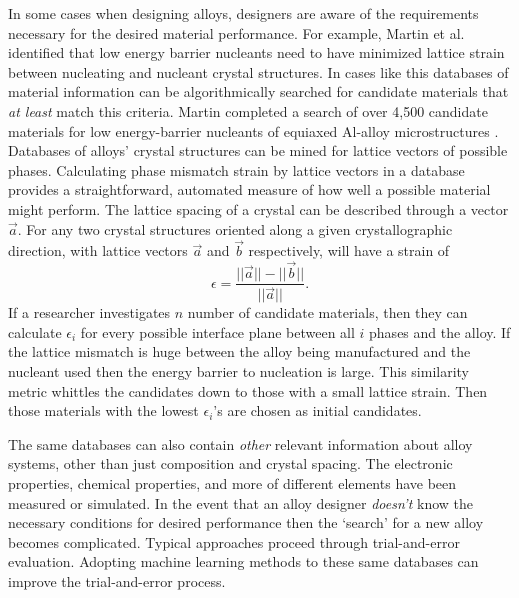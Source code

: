In some cases when designing alloys, designers are aware of the requirements necessary for the desired material performance. For example, Martin et al. identified that low energy barrier nucleants need to have minimized lattice strain between nucleating and nucleant crystal structures. In cases like this databases of material information can be algorithmically searched for candidate materials that \textit{at least} match this criteria. Martin completed a search of over 4,500 candidate materials for low energy-barrier nucleants of equiaxed Al-alloy microstructures \cite{Martin2017}. Databases of alloys' crystal structures can be mined for lattice vectors of possible phases. Calculating phase mismatch strain by lattice vectors in a database provides a straightforward, automated measure of how well a possible material might perform. The lattice spacing of a crystal can be described through a vector $\vec{a}$. For any two crystal structures oriented along a given crystallographic direction, with lattice vectors $\vec{a}$ and $\vec{b}$ respectively, will have a strain of
\begin{equation}
	\epsilon = \frac{||\vec{a}|| - ||\vec{b}||}{||\vec{a}||}.
	\label{strain}
\end{equation}
If a researcher investigates $n$ number of candidate materials, then they can calculate $\epsilon_i$ for every possible interface plane between all $i$ phases and the alloy.  If the lattice mismatch is huge between the alloy being manufactured and the nucleant used then the energy barrier to nucleation is large. This similarity metric whittles the candidates down to those with a small lattice strain. Then those materials with the lowest $\epsilon_i$'s are chosen as initial candidates.


The same databases can also contain \textit{other} relevant information about alloy systems, other than just composition and crystal spacing. The electronic properties, chemical properties, and more of different elements have been measured or simulated. In the event that an alloy designer \textit{doesn't} know the necessary conditions for desired performance then the `search' for a new alloy becomes complicated. Typical approaches proceed through trial-and-error evaluation. Adopting machine learning methods to these same databases can improve the trial-and-error process.

